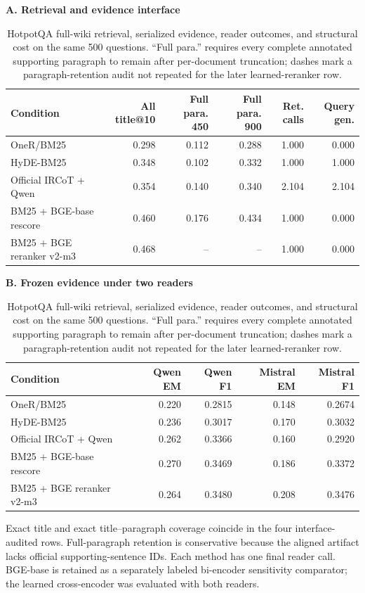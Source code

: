 \begin{table}[t]
\centering
\caption{HotpotQA full-wiki retrieval, serialized evidence, reader outcomes, and structural cost on the same 500 questions. ``Full para.'' requires every complete annotated supporting paragraph to remain after per-document truncation; dashes mark a paragraph-retention audit not repeated for the later learned-reranker row.}
\label{tab:ircot_fullwiki_main}
\scriptsize
\setlength{\tabcolsep}{4pt}
\textbf{A. Retrieval and evidence interface}\par\vspace{2pt}
\begin{tabularx}{\textwidth}{>{\raggedright\arraybackslash}X rrrrr}
\toprule
Condition & All title@10 & Full para. 450 & Full para. 900 & Ret. calls & Query gen. \\
\midrule
OneR/BM25 & 0.298 & 0.112 & 0.288 & 1.000 & 0.000 \\
HyDE-BM25 & 0.348 & 0.102 & 0.332 & 1.000 & 1.000 \\
Official IRCoT + Qwen & 0.354 & 0.140 & 0.340 & 2.104 & 2.104 \\
BM25 + BGE-base rescore & 0.460 & 0.176 & 0.434 & 1.000 & 0.000 \\
BM25 + BGE reranker v2-m3 & 0.468 & -- & -- & 1.000 & 0.000 \\
\bottomrule
\end{tabularx}

\vspace{5pt}
\textbf{B. Frozen evidence under two readers}\par\vspace{2pt}
\begin{tabular}{lrrrr}
\toprule
Condition & Qwen EM & Qwen F1 & Mistral EM & Mistral F1 \\
\midrule
OneR/BM25 & 0.220 & 0.2815 & 0.148 & 0.2674 \\
HyDE-BM25 & 0.236 & 0.3017 & 0.170 & 0.3032 \\
Official IRCoT + Qwen & 0.262 & 0.3366 & 0.160 & 0.2920 \\
BM25 + BGE-base rescore & 0.270 & 0.3469 & 0.186 & 0.3372 \\
BM25 + BGE reranker v2-m3 & 0.264 & 0.3480 & 0.208 & 0.3476 \\
\bottomrule
\end{tabular}
\par\smallskip
\parbox{0.97\textwidth}{\footnotesize Exact title and exact title--paragraph coverage coincide in the four interface-audited rows. Full-paragraph retention is conservative because the aligned artifact lacks official supporting-sentence IDs. Each method has one final reader call. BGE-base is retained as a separately labeled bi-encoder sensitivity comparator; the learned cross-encoder was evaluated with both readers.}
\end{table}
